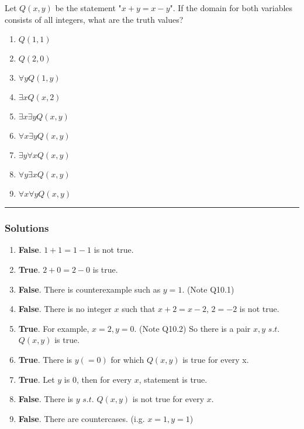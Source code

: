 \newpage
\begin{question}
Let \( Q(x, y) \) be the statement "\( x + y = x - y \)". If the domain for both variables consists of all integers, what are the truth values?
\begin{enumerate}
\item \( Q(1, 1) \)
\item \( Q(2, 0) \)
\item \( \forall y Q(1, y) \)
\item \( \exists x Q(x, 2) \)
\item \( \exists x \exists y Q(x, y) \)
\item \( \forall x \exists y Q(x, y) \)
\item \( \exists y \forall x Q(x, y) \)
\item \( \forall y \exists x Q(x, y) \)
\item \( \forall x \forall y Q(x, y) \)
\end{enumerate}
\end{question}

\par\noindent\rule{\textwidth}{0.5pt}

\subsubsection*{Solutions}
\begin{enumerate}
    \item \textbf{False}. $ 1 + 1 = 1 - 1$ is not true.
    \item \textbf{True}. $ 2 + 0 = 2 - 0$ is true.
    \item \textbf{False}. There is counterexample such as $y = 1$. (Note Q10.1)
    \item \textbf{False}. There is no integer $x$ such that $x + 2 = x - 2$, $2 = -2$ is not true.
    \item \textbf{True}. For example, $x = 2, y = 0$. (Note Q10.2) So there is a pair $x, y$ $s.t.$ $Q(x, y)$ is true.
    \item \textbf{True}. There is $y (= 0)$ for which $Q(x, y)$ is true for every x.
    \item \textbf{True}. Let $y$ is $0$, then for every $x$, statement is true.
    \item \textbf{False}. There is $y$ $s.t.$ $Q(x, y)$ is not true for every $x$.
    \item \textbf{False}. There are countercases. (i.g. $x = 1, y = 1$)
\end{enumerate}